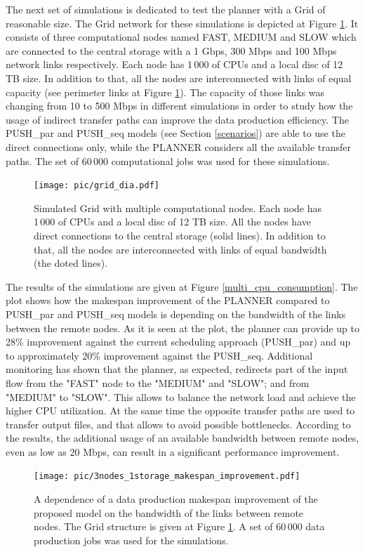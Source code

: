 \documentclass{svjour3}                     %
\begin{document}
The next set of simulations is dedicated to test the planner with a Grid of reasonable size. The Grid network for these simulations is depicted at Figure \ref{simulated_grid}. It consists of three computational nodes named FAST, MEDIUM and SLOW which are connected to the central storage with a 1 Gbps, 300 Mbps and 100 Mbps network links respectively. Each node has 1\,000 of CPUs and a local disc of 12 TB size. In addition to that, all the nodes are interconnected with links of equal capacity (see perimeter links at Figure \ref{simulated_grid}). The capacity of those links was changing from 10 to 500 Mbps in different simulations in order to study how the usage of indirect transfer paths can improve the data production efficiency. The PUSH\_par and PUSH\_seq models (see Section \ref{scenarios}) are able to use the direct connections only, while the PLANNER considers all the available transfer paths. The set of 60\,000 computational jobs was used for these simulations.
\begin{figure}
  \begin{center}
    \texttt{[image: pic/grid\_dia.pdf]}
    \caption{Simulated Grid with multiple computational nodes. Each node has 1\,000 of CPUs and a local disc of 12 TB size. All the nodes have direct connections to the central storage (solid lines). In addition to that, all the nodes are interconnected with links of equal bandwidth (the doted lines).}
    \label{simulated_grid}	
  \end{center}  
\end{figure}

The results of the simulations are given at Figure \ref{multi_cpu_consumption}. The plot shows how the makespan improvement of the PLANNER compared to PUSH\_par and PUSH\_seq models is depending on the bandwidth of the links between the remote nodes. As it is seen at the plot, the planner can provide up to 28\% improvement against the current scheduling approach (PUSH\_par) and up to approximately 20\% improvement against the PUSH\_seq. Additional monitoring has shown that the planner, as expected, redirects part of the input flow from the "FAST" node to the "MEDIUM" and "SLOW"; and from "MEDIUM" to "SLOW". This allows to balance the network load and achieve the higher CPU utilization. At the same time the opposite transfer paths are used to transfer output files, and that allows to avoid possible bottlenecks. According to the results, the additional usage of an available bandwidth between remote nodes, even as low as 20 Mbps, can result in a significant performance improvement.
\begin{figure}
  \begin{center}
    \texttt{[image: pic/3nodes\_1storage\_makespan\_improvement.pdf]}
    \caption{A dependence of a data production makespan improvement of the proposed model on the bandwidth of the links between remote nodes. The Grid structure is given at Figure \ref{simulated_grid}.  A set of 60\,000 data production jobs was used for the simulations.}
      \label{multi_makespan_compare}	
  \end{center}  
\end{figure}
\end{document}
